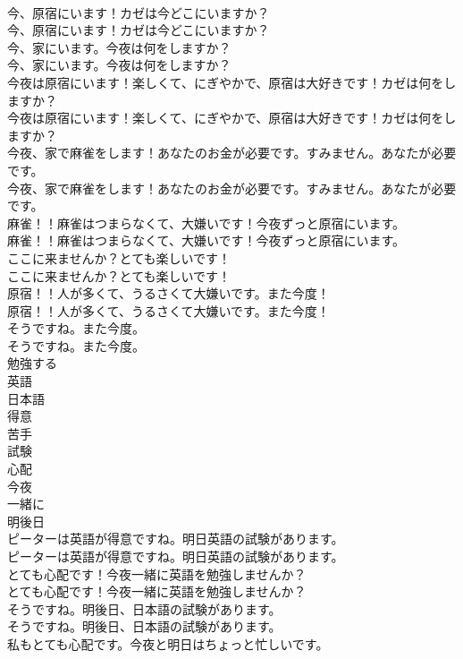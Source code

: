 \documentclass[8pt]{extreport}
\begin{document}
\begin{CJK}{UTF8}{min}
\\	今、原宿にいます！カゼは今どこにいますか？	
\\	今、原宿にいます！カゼは今どこにいますか？ 
\\	今、家にいます。今夜は何をしますか？	
\\	今、家にいます。今夜は何をしますか？ 
\\	今夜は原宿にいます！楽しくて、にぎやかで、原宿は大好きです！カゼは何をしますか？	
\\	今夜は原宿にいます！楽しくて、にぎやかで、原宿は大好きです！カゼは何をしますか？ 
\\	今夜、家で麻雀をします！あなたのお金が必要です。すみません。あなたが必要です。	
\\	今夜、家で麻雀をします！あなたのお金が必要です。すみません。あなたが必要です。 
\\	麻雀！！麻雀はつまらなくて、大嫌いです！今夜ずっと原宿にいます。	
\\	麻雀！！麻雀はつまらなくて、大嫌いです！今夜ずっと原宿にいます。 
\\	ここに来ませんか？とても楽しいです！	
\\	ここに来ませんか？とても楽しいです！ 
\\	原宿！！人が多くて、うるさくて大嫌いです。また今度！	
\\	原宿！！人が多くて、うるさくて大嫌いです。また今度！ 
\\	そうですね。また今度。	
\\	そうですね。また今度。 
\\	勉強する
\\	英語
\\	日本語
\\	得意
\\	苦手
\\	試験
\\	心配
\\	今夜
\\	一緒に
\\	明後日
\\	ピーターは英語が得意ですね。明日英語の試験があります。	
\\	ピーターは英語が得意ですね。明日英語の試験があります。 
\\	とても心配です！今夜一緒に英語を勉強しませんか？	
\\	とても心配です！今夜一緒に英語を勉強しませんか？ 
\\	そうですね。明後日、日本語の試験があります。	
\\	そうですね。明後日、日本語の試験があります。 
\\	私もとても心配です。今夜と明日はちょっと忙しいです。	

\end{CJK}
\end{document}

